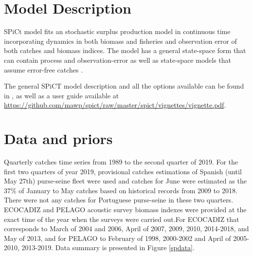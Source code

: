 \documentclass[review]{elsarticle}
\begin{document}



\section{Model Description}







 
 
SPiCt model fits an stochastic surplus production model in continuous time incorporating dynamics in both biomass and fisheries and
observation error of both catches and biomass
indices. The model has a general state-space form
that can contain process and observation-error as well as state-space models that assume error-free catches \citep{Pedersen17}. 
 

 
 The general SPiCT model description and all the options available can be found in \cite{Pedersen17}, as well as a user guide available at \url{https://github.com/mawp/spict/raw/master/spict/vignettes/vignette.pdf}. %




\section{Data and priors }
Quarterly catches time series from 1989 to the second quarter of 2019. For the first two quarters of year 2019, provisional catches estimations of Spanish (until May 27th) purse-seine fleet were used and catches for June were estimated as the 37\% of January to May catches based on historical records from 2009 to 2018. There were not any catches for Portuguese purse-seine in these two quarters. ECOCADIZ and PELAGO acoustic survey biomass indexes were provided at the exact time of the year when the surveys were carried out.For ECOCADIZ that corresponds to March of 2004 and 2006, April of 2007, 2009, 2010, 2014-2018, and May of 2013, and for PELAGO to February of 1998, 2000-2002 and April of 2005-2010, 2013-2019. Data summary is presented in Figure \ref{spdata}.
\end{document}
